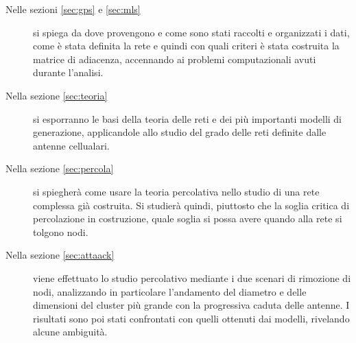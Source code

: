 \begin{description}
\item[Nelle sezioni {\hyperref[sec:gps]{\ref{sec:gps}}} e {\hyperref[sec:mls]{\ref{sec:mls}}}] si spiega da dove provengono e come sono stati raccolti e organizzati i dati, come è stata definita la rete e quindi con quali criteri è stata costruita la matrice di adiacenza, accennando ai problemi computazionali avuti durante l'analisi.

\item[Nella sezione {\hyperref[sec:teoria]{\ref{sec:teoria}}}] si esporranno le basi della teoria delle reti e dei più importanti modelli di generazione, applicandole allo studio del grado delle reti definite dalle antenne cellualari. 

\item[Nella sezione {\hyperref[sec:percola]{\ref{sec:percola}}}] si spiegherà come usare la teoria percolativa nello studio di una rete complessa già costruita. Si studierà quindi, piuttosto che la soglia critica di percolazione in costruzione, quale soglia si possa avere quando alla rete si tolgono nodi.

\item[Nella sezione {\hyperref[sec:attaack]{\ref{sec:attaack}}}] viene effettuato lo studio percolativo mediante i due scenari di rimozione di nodi,  analizzando in particolare l'andamento del diametro e delle dimensioni del cluster più grande con la progressiva caduta delle antenne. I risultati sono poi stati confrontati con quelli ottenuti dai modelli, rivelando alcune ambiguità.

\end{description}